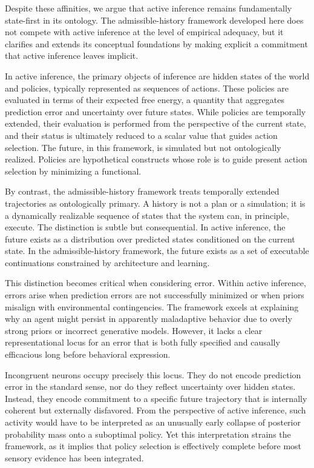 \documentclass[11pt]{article}
\begin{document}
Despite these affinities, we argue that active inference remains fundamentally state-first in its ontology. The admissible-history framework developed here does not compete with active inference at the level of empirical adequacy, but it clarifies and extends its conceptual foundations by making explicit a commitment that active inference leaves implicit.

In active inference, the primary objects of inference are hidden states of the world and policies, typically represented as sequences of actions. These policies are evaluated in terms of their expected free energy, a quantity that aggregates prediction error and uncertainty over future states. While policies are temporally extended, their evaluation is performed from the perspective of the current state, and their status is ultimately reduced to a scalar value that guides action selection. The future, in this framework, is simulated but not ontologically realized. Policies are hypothetical constructs whose role is to guide present action selection by minimizing a functional.

By contrast, the admissible-history framework treats temporally extended trajectories as ontologically primary. A history is not a plan or a simulation; it is a dynamically realizable sequence of states that the system can, in principle, execute. The distinction is subtle but consequential. In active inference, the future exists as a distribution over predicted states conditioned on the current state. In the admissible-history framework, the future exists as a set of executable continuations constrained by architecture and learning.

This distinction becomes critical when considering error. Within active inference, errors arise when prediction errors are not successfully minimized or when priors misalign with environmental contingencies. The framework excels at explaining why an agent might persist in apparently maladaptive behavior due to overly strong priors or incorrect generative models. However, it lacks a clear representational locus for an error that is both fully specified and causally efficacious long before behavioral expression.

Incongruent neurons occupy precisely this locus. They do not encode prediction error in the standard sense, nor do they reflect uncertainty over hidden states. Instead, they encode commitment to a specific future trajectory that is internally coherent but externally disfavored. From the perspective of active inference, such activity would have to be interpreted as an unusually early collapse of posterior probability mass onto a suboptimal policy. Yet this interpretation strains the framework, as it implies that policy selection is effectively complete before most sensory evidence has been integrated.
\end{document}
